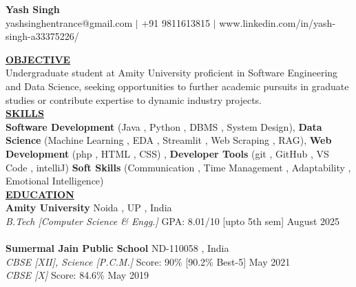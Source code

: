 \documentclass{article}
\begin{document}
\begin{center}
\thispagestyle{empty}
\large \textbf{Yash Singh \\}
\normalsize yashsinghentrance@gmail.com $\mid$ +91 9811613815 $\mid$ www.linkedin.com/in/yash-singh-a33375226/    \\
\hrulefill
\end{center}


\noindent \textbf{\underline{OBJECTIVE}} \\
\noindent Undergraduate student at Amity University proficient in Software Engineering and Data Science, seeking opportunities to further academic pursuits in graduate studies or contribute expertise to dynamic industry projects. \\


\noindent \textbf{\underline{SKILLS}} \\
\textbf{Software Development} (Java , Python , DBMS , System Design), \textbf{Data Science} (Machine Learning , EDA , Streamlit , Web Scraping , RAG), \textbf{Web Development} (php , HTML , CSS) , \textbf{Developer Tools} (git , GitHub , VS Code , intelliJ) \textbf{Soft Skills} (Communication , Time Management , Adaptability , Emotional Intelligence) \\

\noindent \textbf{\underline{EDUCATION}} \\
\textbf{Amity University} \hfill Noida , UP , India \\
\textit{B.Tech [Computer Science \& Engg.]} \hfill \hspace{-0.3cm} GPA: 8.01/10 [upto 5th sem] \hfill August 2025 \\ \\
\textbf{Sumermal Jain Public School} \hfill  ND-110058 , India\\
\textit{CBSE [XII], Science [P.C.M.]} \hfill Score: 90\% [90.2\% Best-5] \hfill May 2021 \\
\textit{CBSE [X]} \hfill \hspace{0.95cm} Score: 84.6\%  \hfill May 2019 \\
\end{document}

